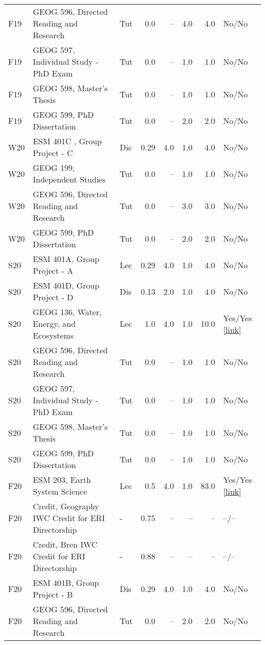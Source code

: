 \begin{longtable}{p{1cm}p{7cm}p{0.75cm}rrrrp{2.5cm}}
F19 & GEOG 596, Directed Reading and Research & Tut & 0.0 & -- & 4.0 & 4.0 & No/No    \\ 
F19 & GEOG 597, Individual Study - PhD Exam & Tut & 0.0 & -- & 1.0 & 1.0 & No/No    \\ 
F19 & GEOG 598, Master’s Thesis & Tut & 0.0 & -- & 1.0 & 1.0 & No/No    \\ 
F19 & GEOG 599, PhD Dissertation & Tut & 0.0 & -- & 2.0 & 2.0 & No/No    \\ 
W20 & ESM 401C , Group Project - C & Dis & 0.29 & 4.0 & 1.0 & 4.0 & No/No    \\ 
W20 & GEOG 199, Independent Studies & Tut & 0.0 & -- & 1.0 & 1.0 & No/No    \\ 
W20 & GEOG 596, Directed Reading and Research & Tut & 0.0 & -- & 3.0 & 3.0 & No/No    \\ 
W20 & GEOG 599, PhD Dissertation & Tut & 0.0 & -- & 2.0 & 2.0 & No/No    \\ 
S20 & ESM 401A, Group Project - A & Lec & 0.29 & 4.0 & 1.0 & 4.0 & No/No    \\ 
S20 & ESM 401D, Group Project - D & Dis & 0.13 & 2.0 & 1.0 & 4.0 & No/No    \\ 
S20 & GEOG 136, Water, Energy, and Ecosystems & Lec & 1.0 & 4.0 & 1.0 & 10.0 & Yes/Yes  \href{https://ucsb.box.com/s/4k3squfamwz4gg5mj2q79wo5qk29bubb}{[link]}  \\ 
S20 & GEOG 596, Directed Reading and Research & Tut & 0.0 & -- & 1.0 & 1.0 & No/No    \\ 
S20 & GEOG 597, Individual Study - PhD Exam & Tut & 0.0 & -- & 1.0 & 1.0 & No/No    \\ 
S20 & GEOG 598, Master’s Thesis & Tut & 0.0 & -- & 1.0 & 1.0 & No/No    \\ 
S20 & GEOG 599, PhD Dissertation & Tut & 0.0 & -- & 1.0 & 1.0 & No/No    \\ 
F20 & ESM 203, Earth System Science & Lec & 0.5 & 4.0 & 1.0 & 83.0 & Yes/Yes  \href{https://ucsb.box.com/s/x8g8gcl7mtfahclm1zledaita1z5tgin}{[link]}  \\ 
F20 & Credit, Geography IWC Credit for ERI Directorship & - & 0.75 & -- & -- & -- & --/--    \\ 
F20 & Credit, Bren IWC Credit for ERI Directorship & - & 0.88 & -- & -- & -- & --/--    \\ 
F20 & ESM 401B, Group Project - B & Dis & 0.29 & 4.0 & 1.0 & 4.0 & No/No    \\ 
F20 & GEOG 596, Directed Reading and Research & Tut & 0.0 & -- & 2.0 & 2.0 & No/No    \\ 

\end{longtable}

